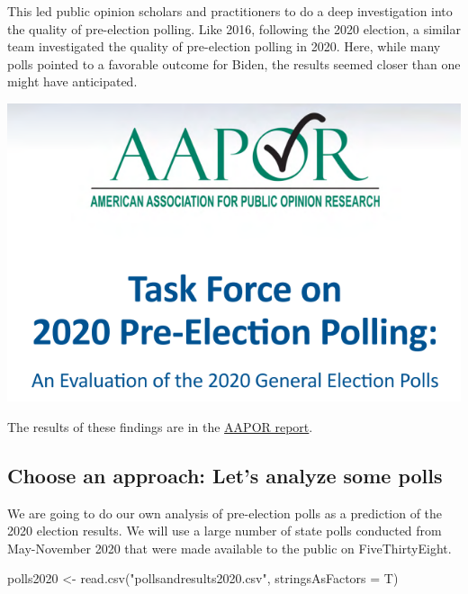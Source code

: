 \documentclass[
  letterpaper,
  DIV=11,
  numbers=noendperiod]{scrreprt}
\newenvironment{Shaded}{\begin{snugshade}}{\end{snugshade}}
\newcommand{\AttributeTok}[1]{\textcolor[rgb]{0.40,0.45,0.13}{#1}}
\newcommand{\FunctionTok}[1]{\textcolor[rgb]{0.28,0.35,0.67}{#1}}
\newcommand{\NormalTok}[1]{\textcolor[rgb]{0.00,0.23,0.31}{#1}}
\newcommand{\OtherTok}[1]{\textcolor[rgb]{0.00,0.23,0.31}{#1}}
\newcommand{\StringTok}[1]{\textcolor[rgb]{0.13,0.47,0.30}{#1}}
\begin{document}
This led public opinion scholars and practitioners to do a deep
investigation into the quality of pre-election polling. Like 2016,
following the 2020 election, a similar team investigated the quality of
pre-election polling in 2020. Here, while many polls pointed to a
favorable outcome for Biden, the results seemed closer than one might
have anticipated.

\includegraphics{images/aaportitle.png}

The results of these findings are in the
\href{https://www.aapor.org/AAPOR_Main/media/MainSiteFiles/AAPOR-Task-Force-on-2020-Pre-Election-Polling_Report-FNL.pdf}{AAPOR
report}.

\hypertarget{choose-an-approach-lets-analyze-some-polls}{%
\subsection{Choose an approach: Let's analyze some
polls}\label{choose-an-approach-lets-analyze-some-polls}}

We are going to do our own analysis of pre-election polls as a
prediction of the 2020 election results. We will use a large number of
state polls conducted from May-November 2020 that were made available to
the public on FiveThirtyEight.

\begin{Shaded}
\begin{Highlighting}[]
\NormalTok{polls2020 }\OtherTok{\textless{}{-}} \FunctionTok{read.csv}\NormalTok{(}\StringTok{"pollsandresults2020.csv"}\NormalTok{, }\AttributeTok{stringsAsFactors =}\NormalTok{ T)}
\end{Highlighting}
\end{Shaded}
\end{document}
